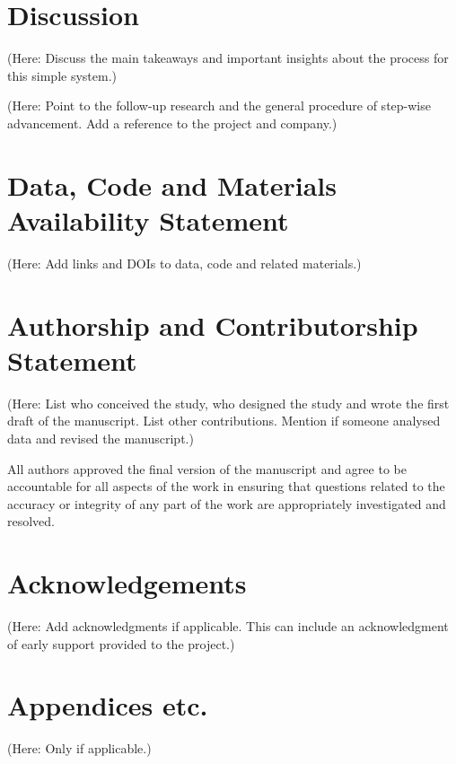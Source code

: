 \documentclass{ldr-article}
\begin{document}
\section{Discussion}

(Here: Discuss the main takeaways and important insights about the process for this simple system.)

(Here: Point to the follow-up research and the general procedure of step-wise advancement. Add a reference to the project and company.)


\section{Data, Code and Materials Availability Statement}

(Here: Add links and DOIs to data, code and related materials.)

\section{Authorship and Contributorship Statement}

(Here: List who conceived the study, who designed the study and wrote the first draft of the manuscript. List other contributions. Mention if someone analysed data and revised the manuscript.)

All authors approved the final version of the manuscript and agree to be accountable for all aspects of the work in ensuring that questions related to the accuracy or integrity of any part of the work are appropriately investigated and resolved.

\section{Acknowledgements}

(Here: Add acknowledgments if applicable. This can include an acknowledgment of early support provided to the project.)

\clearpage
\appendix

\section{Appendices etc.}

(Here: Only if applicable.)
\end{document}

